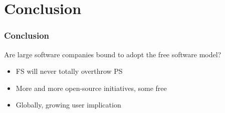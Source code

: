 \documentclass{beamer}
\begin{document}
\section{Conclusion}

\begin{frame}

  \frametitle{Conclusion}

  \begin{block}{}
    \begin{center}
      Are large software companies bound to adopt the free software
      model?
    \end{center}
  \end{block}

  \vfill

  \begin{itemize}
    \item{FS will never totally overthrow PS}
    \item{More and more open-source initiatives, some free}
    \item{Globally, growing user implication}
  \end{itemize}

\end{frame}
\end{document}
